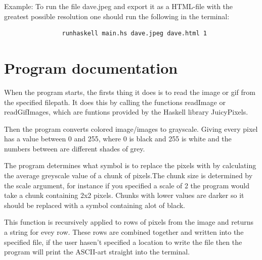\documentclass[12pt, a4paper]{article}
\begin{document}
		Example: To run the file dave.jpeg and export it as a HTML-file with the greatest possible resolution one should run the following in the terminal:
		
		\begin{footnotesize}
			\begin{verbatim}
				runhaskell main.hs dave.jpeg dave.html 1
			\end{verbatim}
		\end{footnotesize} 

	\section{Program documentation}

	When the program starts, the firsts thing it does is to read the image or gif from the specified filepath. It does this by calling the functions readImage or readGifImages, which are funtions provided by the Haskell library JuicyPixels. 

	Then the program converts colored image/images to grayscale. Giving every pixel has a value between 0 and 255, where 0 is black and 255 is white and the numbers between are different shades of grey.

	The program determines what symbol is to replace the pixels with by calculating the average greyscale value of a chunk of pixels.The chunk size is determined by the scale argument, for instance if you specified a scale of 2 the program would take a chunk containing 2x2 pixels. Chunks with lower values are darker so it should be replaced with a symbol containing alot of black. 

	This function is recursively applied to rows of pixels from the image and returns a string for evey row.  These rows are combined together and written into the specified file, if the user hasen't specified a location to write the file then the program will print the ASCII-art straight into the terminal.


\end{document}

